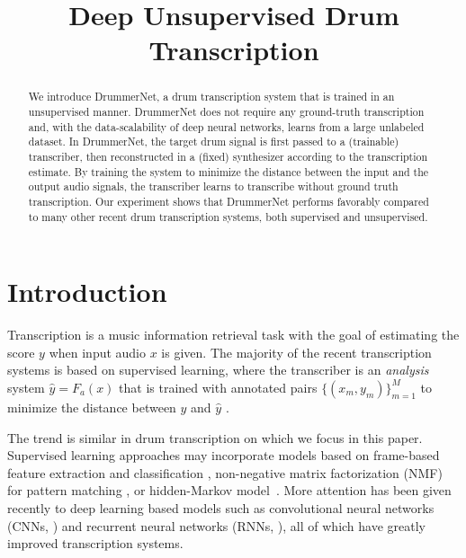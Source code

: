 \documentclass{article}
\title{Deep Unsupervised Drum Transcription}
\newcommand{\squeeze}{\vspace{-0.15cm}}
\newcommand{\smallsqueeze}{\vspace{-0.1cm}}
\begin{document}
	\maketitle
	\squeeze
	
	\begin{abstract}
		\squeeze
		We introduce DrummerNet, a drum transcription system that is trained in an unsupervised manner. DrummerNet does not require any ground-truth transcription and, with the data-scalability of deep neural networks, learns from a large unlabeled dataset. In DrummerNet, the target drum signal is first passed to a (trainable) transcriber, then reconstructed in a (fixed) synthesizer according to the transcription estimate. By training the system to minimize the distance between the input and the output audio signals, the transcriber learns to transcribe without ground truth transcription. Our experiment shows that DrummerNet performs favorably compared to many other recent drum transcription systems, both supervised and unsupervised.
	\end{abstract}
	
	\squeeze
	\section{Introduction}
	\label{sec:introduction}
	\smallsqueeze
	Transcription is a music information retrieval task with the goal of estimating the score $y$ when input audio $x$ is given. The majority of the recent transcription systems is based on supervised learning, where the transcriber is an \textit{analysis} system 
	$\hat{y} = F_a(x)$ that is trained with annotated pairs $\{ (x_m, y_m) \}_{m=1}^M$ to minimize the distance between $y$ and $\hat{y}$ \cite{poliner2006discriminative, bock2012polyphonic, sigtia2016end, vogl2016recurrent, vogl2017drum, southall2016automatic, southall2017automatic, cartwright2018increasing}. 
	
	The trend is similar in drum transcription on which we focus in this paper. 
	Supervised learning approaches may incorporate models based on frame-based feature extraction and classification \cite{gouyon2000use}, non-negative matrix factorization (NMF) for pattern matching \cite{dittmar2014real}, or hidden-Markov model~\cite{paulus2009drum}. 
	More attention has been given recently to deep learning based models such as convolutional neural networks (CNNs, \cite{gajhede2016convolutional, southall2017automatic}) and recurrent neural networks (RNNs, \cite{vogl2016recurrent, vogl2017drum, southall2016automatic}), all of which have greatly improved transcription systems.
	
\end{document}
